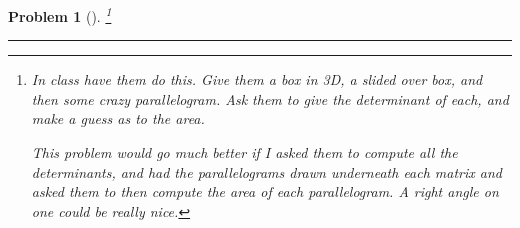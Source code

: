 \documentclass[letterpaper,oneside]{book}%
\let\oldmarginpar\marginpar
\renewcommand\marginpar[1]{\-\oldmarginpar{\raggedright\footnotesize #1}}
\renewcommand{\thefootnote}{\roman{footnote}}
\newcommand{\note}[1]{\footnote{#1}\marginpar{\fbox{\textbf{\thefootnote}}}}
\newcommand{\note}[1]{}
\theoremstyle{plain}
\theoremstyle{box}
\theoremstyle{problem}
\newtheorem{problemnum}{Problem}[chapter]
\newenvironment{problem}[1][]{\begin{problemnum}[#1]}{\end{problemnum}\nopagebreak\hrule\bigskip}
\begin{document}
\begin{problem}
\note{In class have them do this. Give them a box in 3D, a slided over box, and then some crazy parallelogram.  Ask them to give the determinant of each, and make a guess as to the area.

This problem would go much better if I asked them to compute all the determinants, and had the parallelograms drawn underneath each matrix and asked them to then compute the area of each parallelogram.  A right angle on one could be really nice.
} 
\end{problem}


\end{document}
